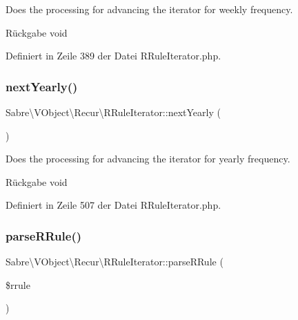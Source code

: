 Does the processing for advancing the iterator for weekly frequency.

\begin{DoxyReturn}{Rückgabe}
void 
\end{DoxyReturn}


Definiert in Zeile 389 der Datei R\+Rule\+Iterator.\+php.

\mbox{\label{class_sabre_1_1_v_object_1_1_recur_1_1_r_rule_iterator_ad7722aa2d9f9b5afe25a1842f78dc728}} 
\subsubsection{\texorpdfstring{next\+Yearly()}{nextYearly()}}
{\footnotesize\ttfamily Sabre\textbackslash{}\+V\+Object\textbackslash{}\+Recur\textbackslash{}\+R\+Rule\+Iterator\+::next\+Yearly (\begin{DoxyParamCaption}{ }\end{DoxyParamCaption})\hspace{0.3cm}{\ttfamily [protected]}}

Does the processing for advancing the iterator for yearly frequency.

\begin{DoxyReturn}{Rückgabe}
void 
\end{DoxyReturn}


Definiert in Zeile 507 der Datei R\+Rule\+Iterator.\+php.

\mbox{\label{class_sabre_1_1_v_object_1_1_recur_1_1_r_rule_iterator_aee971dcab644f894b63c6dfaeabbc9f1}} 
\subsubsection{\texorpdfstring{parse\+R\+Rule()}{parseRRule()}}
{\footnotesize\ttfamily Sabre\textbackslash{}\+V\+Object\textbackslash{}\+Recur\textbackslash{}\+R\+Rule\+Iterator\+::parse\+R\+Rule (\begin{DoxyParamCaption}\item[{}]{\$rrule }\end{DoxyParamCaption})\hspace{0.3cm}{\ttfamily [protected]}}

